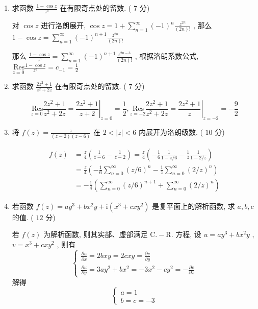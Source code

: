 \documentclass[cn,11pt,fancy,hide]{elegantbook}
\newcommand{\ii}{\mathrm{i}}
\newcommand{\Res}{\,\mathrm{Res}}
\begin{document}
\begin{enumerate}
	\item 求函数 $\frac{1-\cos z}{z^3}$ 在有限奇点处的留数. ( $7$ 分)
	\begin{solution}
		对 $\cos z$ 进行洛朗展开, $\cos z=1+\sum_{n=1}^{\infty}(-1)^n\frac{z^{2n}}{(2n)!}$ , 那么 $1-\cos z=\sum_{n=1}^{\infty}(-1)^{n+1}\frac{z^{2n}}{(2n)!}$
		
		那么 $\frac{1-\cos z}{z^3}=\sum_{n=1}^{\infty}(-1)^{n+1}\frac{z^{2n-3}}{(2n)!}$ , 根据洛朗系数公式, $\underset{z=0}{\Res}\frac{1-\cos z}{z^3}=c_{-1}=\frac{1}{2}$
	\end{solution}
	
	\item 求函数 $\frac{2z^2+1}{z^2+2z}$ 在有限奇点处的留数. ( $7$ 分)
	\begin{solution}
		\begin{equation*}
			\underset{z=0}{\Res}\frac{2z^2+1}{z^2+2z}=\left.\frac{2z^2+1}{z+2} \right|_{z=0}=\frac{1}{2} , 
			\underset{z=-2}{\Res}\frac{2z^2+1}{z^2+2z}=\left.\frac{2z^2+1}{z}\right|_{z=-2}=-\frac{9}{2}
		\end{equation*}
		
	\end{solution}
	
	\item 将 $f(z)=\frac{z}{(z-2)(z-6)}$ 在 $2<|z|<6$ 内展开为洛朗级数. ( $10$ 分)
	\begin{solution}
		\begin{align*}
			f(z)&=\frac{z}{4}\left( \frac{1}{z-6}-\frac{1}{z-2}\right) =\frac{z}{4}\left( -\frac{1}{6}\frac{1}{1-z/6}-\frac{1}{z}\frac{1}{1-2/z}\right) \\
			&=\frac{z}{4}\left( -\frac{1}{6}\sum_{n=0}^{\infty}(z/6)^n-\frac{1}{z}\sum_{n=0}^{\infty}(2/z)^n\right)\\
			&=-\frac{1}{4}\left( \sum_{n=0}^{\infty}(z/6)^{n+1}+\sum_{n=0}^{\infty}(2/z)^n\right)  
		\end{align*}
	\end{solution}
	
	\item 若函数 $f(z)=a y^{3}+b x^{2} y+\ii\left(x^{3}+c x y^{2}\right)$ 是复平面上的解析函数, 求 $a,b,c$ 的值. ( $12$ 分)
	\begin{solution}
		若 $f(z)$ 为解析函数, 则其实部、虚部满足 $\mathrm{C}.-\mathrm{R}.$ 方程, 设 $u=ay^3+bx^2y$ , $v=x^3+cxy^2$ , 则有
		\begin{equation*}
			\begin{cases}
			\frac{\partial u}{\partial x}=2 b x y=2 c x y=\frac{\partial v}{\partial y}\\
			\frac{\partial u}{\partial y}=3 a y^{2}+b x^{2}=-3 x^{2}-c y^{2}=-\frac{\partial v}{\partial x}
			\end{cases}
		\end{equation*}
		解得\begin{equation*}
			\begin{cases}
			a=1\\
			b=c=-3
			\end{cases}
		\end{equation*}
		

\end{solution}
\end{enumerate}
\end{document}
